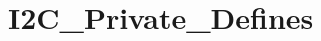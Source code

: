 \hypertarget{group___i2_c___private___defines}{\section{I2\-C\-\_\-\-Private\-\_\-\-Defines}
\label{group___i2_c___private___defines}
}
